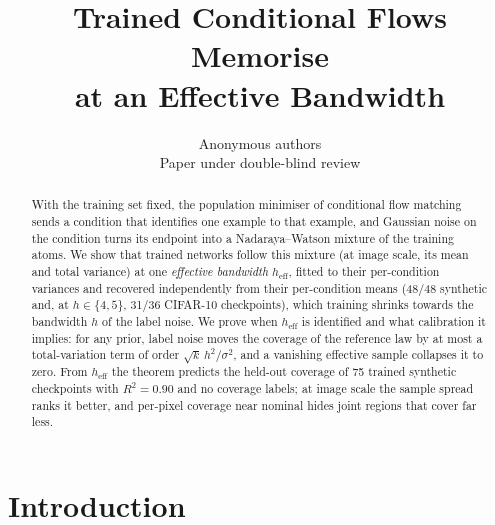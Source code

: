 \documentclass{article}
\title{Trained Conditional Flows Memorise\\
at an Effective Bandwidth}
\author{Anonymous authors \\ Paper under double-blind review}
\theoremstyle{plain}
\theoremstyle{remark}
\begin{document}
\maketitle

\begin{abstract}
With the training set fixed, the population minimiser of conditional flow matching
sends a condition that identifies one example to that example, and Gaussian noise on
the condition turns its endpoint into a Nadaraya--Watson mixture of the training atoms.
We show that trained networks follow this mixture (at image scale, its mean and total
variance) at one \emph{effective bandwidth}
$h_{\mathrm{eff}}$, fitted to their per-condition variances and recovered independently
from their per-condition means (48/48 synthetic and, at $h\in\{4,5\}$, 31/36 CIFAR-10 checkpoints), which
training shrinks towards the bandwidth $h$ of the label noise. We prove when
$h_{\mathrm{eff}}$ is identified and what calibration it implies: for any prior, label
noise moves the coverage of the reference law by at most a total-variation term of
order $\sqrt{k}\,h^2/\sigma^2$, and a vanishing effective sample collapses it to zero.
From $h_{\mathrm{eff}}$ the theorem predicts the held-out coverage of 75 trained
synthetic checkpoints with $R^2=0.90$ and no coverage labels; at image scale the sample
spread ranks it better, and per-pixel coverage near nominal hides joint regions that
cover far less.
\end{abstract}

\section{Introduction}
\end{document}
